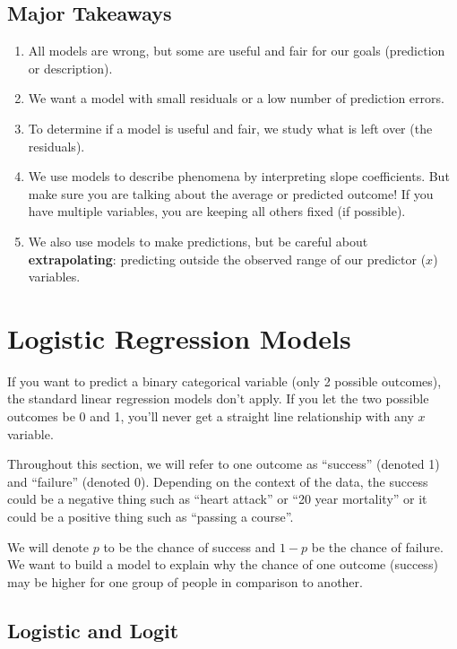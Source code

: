\documentclass[]{book}
\begin{document}
\hypertarget{major-takeaways-2}{%
\section{Major Takeaways}\label{major-takeaways-2}}

\begin{enumerate}
\def\labelenumi{\arabic{enumi}.}
\item
  All models are wrong, but some are useful and fair for our goals (prediction or description).
\item
  We want a model with small residuals or a low number of prediction errors.
\item
  To determine if a model is useful and fair, we study what is left over (the residuals).
\item
  We use models to describe phenomena by interpreting slope coefficients. But make sure you are talking about the average or predicted outcome! If you have multiple variables, you are keeping all others fixed (if possible).
\item
  We also use models to make predictions, but be careful about \textbf{extrapolating}: predicting outside the observed range of our predictor (\(x\)) variables.
\end{enumerate}

\hypertarget{logistic-regression-models}{%
\chapter{Logistic Regression Models}\label{logistic-regression-models}}

If you want to predict a binary categorical variable (only 2 possible outcomes), the standard linear regression models don't apply. If you let the two possible outcomes be 0 and 1, you'll never get a straight line relationship with any \(x\) variable.

Throughout this section, we will refer to one outcome as ``success'' (denoted 1) and ``failure'' (denoted 0). Depending on the context of the data, the success could be a negative thing such as ``heart attack'' or ``20 year mortality'' or it could be a positive thing such as ``passing a course''.

We will denote \(p\) to be the chance of success and \(1-p\) be the chance of failure. We want to build a model to explain why the chance of one outcome (success) may be higher for one group of people in comparison to another.

\hypertarget{logistic-and-logit}{%
\section{Logistic and Logit}\label{logistic-and-logit}}
\end{document}

